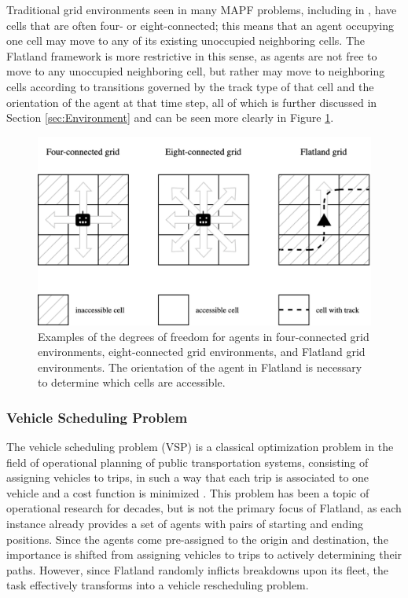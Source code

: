 \documentclass[11pt]{article}
\begin{document}
Traditional grid environments seen in many MAPF problems, including in \citep{standley10a}, have cells that are often four- or eight-connected; this means that an agent occupying one cell may move to any of its existing unoccupied neighboring cells.  The Flatland framework is more restrictive in this sense, as agents are not free to move to any unoccupied neighboring cell, but rather may move to neighboring cells according to transitions governed by the track type of that cell and the orientation of the agent at that time step, all of which is further discussed in Section \ref{sec:Environment} and can be seen more clearly in Figure \ref{fig:grids}.

\begin{figure}[t]
\label{fig:grids}
\includegraphics[width=\textwidth]{grids}
\caption{Examples of the degrees of freedom for agents in four-connected grid environments, eight-connected grid environments, and Flatland grid environments. The orientation of the agent in Flatland is necessary to determine which cells are accessible. }
\centering
\end{figure}

\subsubsection{Vehicle Scheduling Problem}
The vehicle scheduling problem (VSP) is a classical optimization problem in the field of operational planning of public transportation systems, consisting of assigning vehicles to trips, in such a way that each trip is associated to one vehicle and a cost function is minimized \citep{bapeukfa00a}.  This problem has been a topic of operational research for decades, but is not the primary focus of Flatland, as each instance already provides a set of agents with pairs of starting and ending positions. Since the agents come pre-assigned to the origin and destination, the importance is shifted from assigning vehicles to trips to actively determining their paths.  However, since Flatland randomly inflicts breakdowns upon its fleet, the task effectively transforms into a vehicle rescheduling problem.
\end{document}
